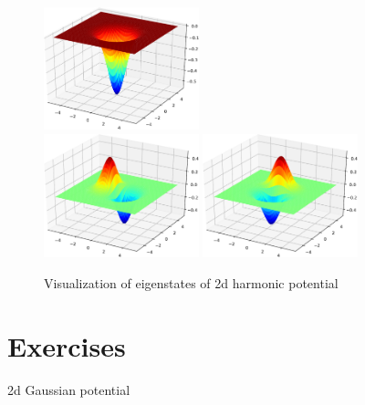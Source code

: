 \begin{figure}[H]
{\centering
\includegraphics[width=0.4\textwidth]{../codes/sch_2d/IMG_harmonic_psi_1.pdf}\\
\includegraphics[width=0.4\textwidth]{../codes/sch_2d/IMG_harmonic_psi_2.pdf}%
\includegraphics[width=0.4\textwidth]{../codes/sch_2d/IMG_harmonic_psi_3.pdf}
\par}
\caption{Visualization of eigenstates of 2d harmonic potential}
\label{fig:harm_2d_eigenfunctions}
\end{figure}

\section{Exercises}

2d Gaussian potential